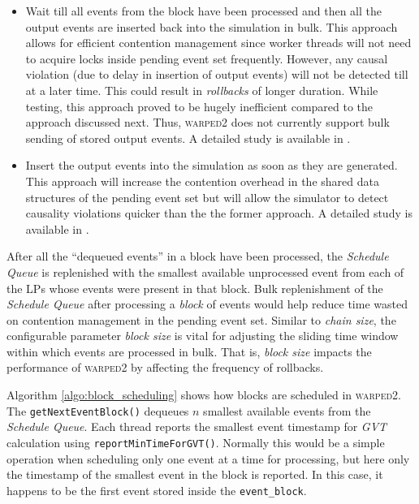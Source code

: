 \documentclass[11pt]{book}
\begin{document}
\begin{itemize}

\item Wait till all events from the block have been processed and then all the output events are inserted back
  into the simulation in bulk.  This approach allows for efficient contention management since worker threads
  will not need to acquire locks inside pending event set frequently.  However, any causal violation (due to
  delay in insertion of output events) will not be detected till at a later time.  This could result in
  \emph{rollbacks} of longer duration.  While testing, this approach proved to be hugely inefficient compared
  to the approach discussed next.  Thus, \textsc{warped2} does not currently support bulk sending of stored
  output events.  A detailed study is available in \cite{gupta-17}.

\item Insert the output events into the simulation as soon as they are generated.  This approach will increase
  the contention overhead in the shared data structures of the pending event set but will allow the simulator
  to detect causality violations quicker than the the former approach.  A detailed study is available in
  \cite{gupta-17}.

\end{itemize}

After all the ``dequeued events'' in a block have been processed, the \emph{Schedule Queue} is replenished
with the smallest available unprocessed event from each of the LPs whose events were present in that block.
Bulk replenishment of the \emph{Schedule Queue} after processing a \emph{block} of events would help reduce
time wasted on contention management in the pending event set.  Similar to \emph{chain size}, the configurable
parameter \emph{block size} is vital for adjusting the sliding time window within which events are processed
in bulk.  That is, \emph{block size} impacts the performance of \textsc{warped2} by affecting the frequency of
rollbacks.

Algorithm \ref{algo:block_scheduling} shows how blocks are scheduled in \textsc{warped2}.  The
\texttt{getNextEventBlock()} dequeues $n$ smallest available events from the \emph{Schedule Queue}.  Each
thread reports the smallest event timestamp for \emph{GVT} calculation using \texttt{reportMinTimeForGVT()}.
Normally this would be a simple operation when scheduling only one event at a time for processing, but here
only the timestamp of the smallest event in the block is reported.  In this case, it happens to be the first
event stored inside the \texttt{event\_block}.
\end{document}
